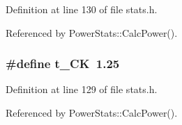 Definition at line 130 of file stats.h.

Referenced by PowerStats::CalcPower().
\subsubsection[{t\_\-CK}]{\setlength{\rightskip}{0pt plus 5cm}\#define t\_\-CK~1.25}\label{stats_8h_e93bb720f685333933de5bf2d3e88bad}




Definition at line 129 of file stats.h.

Referenced by PowerStats::CalcPower().